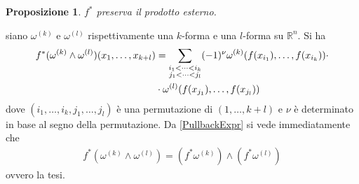 \documentclass[twoside, 11pt]{amsbook}
\makeatletter
\newcommand{\0}{{(0)}}
\newcommand{\3}{{(3)}}
\theoremstyle{colonplain}
\newtheorem{prop}[thm]{Proposizione}
\theoremstyle{colondefinition}
\theoremstyle{colonremark}
\numberwithin{equation}{chapter}
\renewcommand{\proofname}{Dimostrazione}
\renewenvironment{proof}[1][\proofname]{\par
  \pushQED{\qed}%
  \normalfont \topsep6\p@\@plus6\p@\relax
  \trivlist
  \item[\hskip\labelsep\bfseries #1:]\ignorespaces
}{%
  \popQED\endtrivlist\@endpefalse
}
\makeatother
\begin{document}
\begin{prop} $f^*$ preserva il prodotto esterno.
\end{prop}
\begin{proof} siano $\omega^{(k)}$ e $\omega^{(l)}$ rispettivamente una $k$-forma e una $l$-forma su $\mathbb{R}^n$. Si ha 
\begin{align}\label{PullbackExpr}
    f^*(\omega^{(k)} \wedge \omega^{(l)})(x_1, \dots, x_{k + l}) &= \sum_{\substack{i_1 < \dots < i_k \\ j_1 < \dots < j_l}}(-1)^\nu\omega^{(k)}(f(x_{i_1}), \dots, f(x_{i_k})) \cdot \notag \\
    &\cdot \omega^{(l)}(f(x_{j_1}), \dots, f(x_{j_l})) 
\end{align}
dove $(i_1, \dots, i_k, j_1, \dots, j_l)$ è una permutazione di $(1, \dots, k + l)$ e $\nu$ è determinato in base al segno della permutazione. Da \eqref{PullbackExpr} si vede immediatamente che
\begin{align}
    f^*(\omega^{(k)} \wedge \omega^{(l)}) = (f^*\omega^{(k)}) \wedge (f^*\omega^{(l)}) 
\end{align}
ovvero la tesi. \end{proof}
\end{document}
